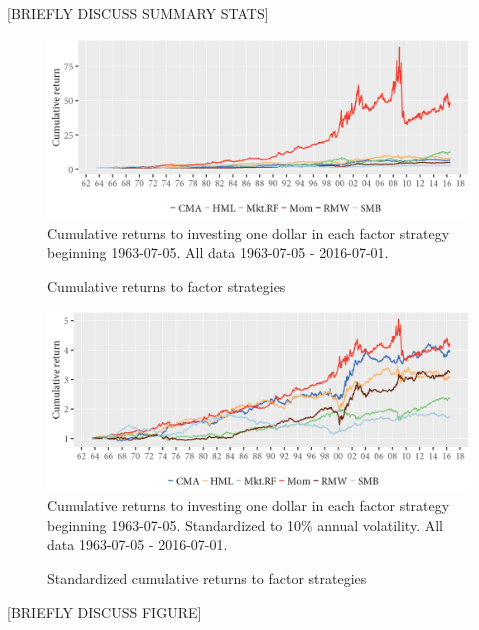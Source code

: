 [BRIEFLY DISCUSS SUMMARY STATS]

\begin{figure}[H]
  \caption{Cumulative returns to factor strategies}
  \label{diag:cumret}
  \toprule
  \centering
  \begin{minipage}{\textwidth}
  \includegraphics[scale=1]{graphics/cumretPlot.png}  
  \bottomrule
  \vspace{3mm}
  \footnotesize
  Cumulative returns to investing one dollar in each factor strategy beginning 1963-07-05.  All data 1963-07-05 - 2016-07-01.
  \end{minipage}
\end{figure}

\begin{figure}[H]
  \caption{Standardized cumulative returns to factor strategies}
  \label{diag:cumretstd}
  \toprule
  \centering
  \begin{minipage}{\textwidth}
  \includegraphics[scale=1]{graphics/cumretStdPlot.png}  
  \bottomrule
  \vspace{3mm}
  \footnotesize
  Cumulative returns to investing one dollar in each factor strategy beginning 1963-07-05. Standardized to 10\% annual volatility. All data 1963-07-05 - 2016-07-01.
  \end{minipage}
\end{figure}

[BRIEFLY DISCUSS FIGURE]